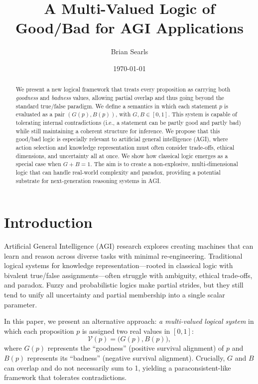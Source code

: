 \documentclass[11pt]{article}
\title{A Multi-Valued Logic of Good/Bad for AGI Applications}
\author{Brian Searls}
\date{\today}
\begin{document}
\maketitle

\begin{abstract}
We present a new logical framework that treats every proposition as carrying both 
\emph{goodness} and \emph{badness} values, allowing partial overlap and thus going 
beyond the standard true/false paradigm. We define a semantics in which each statement
\(p\) is evaluated as a pair \((G(p), B(p))\), with \(G, B \in [0,1]\). This system 
is capable of tolerating internal contradictions (i.e., a statement can be partly 
good and partly bad) while still maintaining a coherent structure for inference. We 
propose that this good/bad logic is especially relevant to artificial general intelligence (AGI), 
where action selection and knowledge representation must often consider trade-offs, 
ethical dimensions, and uncertainty all at once. We show how classical logic emerges 
as a special case when \(G + B = 1\). The aim is to create a non-explosive, 
multi-dimensional logic that can handle real-world complexity and paradox, providing a 
potential substrate for next-generation reasoning systems in AGI.
\end{abstract}

\section{Introduction}

Artificial General Intelligence (AGI) research explores creating machines that can learn 
and reason across diverse tasks with minimal re-engineering. Traditional logical systems 
for knowledge representation---rooted in classical logic with bivalent true/false 
assignments---often struggle with ambiguity, ethical trade-offs, and paradox. 
Fuzzy and probabilistic logics make partial strides, but they still tend to unify all 
uncertainty and partial membership into a single scalar parameter.

In this paper, we present an alternative approach: \emph{a multi-valued logical system} in which 
each proposition \(p\) is assigned two real values in \([0,1]\):
\[
   \mathcal{V}(p) = \bigl(G(p), B(p)\bigr),
\]
where \(G(p)\) represents the ``goodness'' (positive survival alignment) of \(p\) 
and \(B(p)\) represents its ``badness'' (negative survival alignment).
Crucially, \(G\) and \(B\) can overlap and do not necessarily sum to 1, 
yielding a paraconsistent-like framework that tolerates contradictions. 
\end{document}

